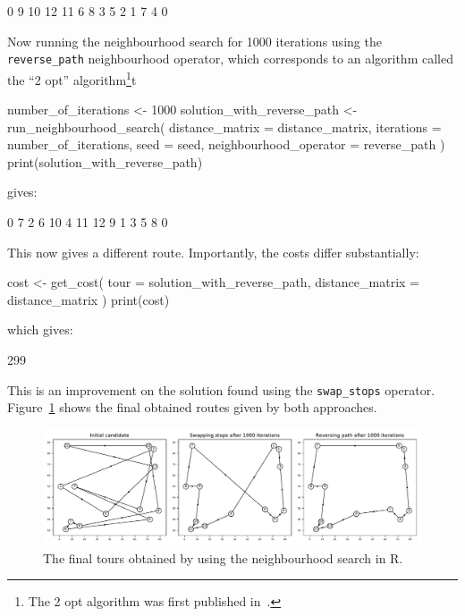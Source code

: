 \begin{Rout}
 [1]  0  9 10 12 11  6  8  3  5  2  1  7  4  0
\end{Rout}

Now running the neighbourhood search for 1000 iterations using the
\texttt{reverse_path} neighbourhood operator, which corresponds to
an algorithm called the ``2 opt'' algorithm\footnote{The 2 opt algorithm was
first published in~\cite{croes1958method}.
}t

\begin{Rin}
number_of_iterations <- 1000
solution_with_reverse_path <- run_neighbourhood_search(
  distance_matrix = distance_matrix,
  iterations = number_of_iterations,
  seed = seed,
  neighbourhood_operator = reverse_path
)
print(solution_with_reverse_path)
\end{Rin}

gives:

\begin{Rout}
 [1]  0  7  2  6 10  4 11 12  9  1  3  5  8  0
\end{Rout}

This now gives a different route.
Importantly, the costs differ substantially:

\begin{Rin}
cost <- get_cost(
  tour = solution_with_reverse_path,
  distance_matrix = distance_matrix
)
print(cost)
\end{Rin}

which gives:

\begin{Rout}
[1] 299
\end{Rout}

This is an improvement on the solution found using the \texttt{swap_stops}
operator. Figure~\ref{fig:final-tsp-tours-r} shows the final obtained routes
given by both approaches.


\begin{figure}
    \begin{center}
        \includegraphics[width=\textwidth]{./assets/final-tsp-tours-with-R/main.pdf}
    \end{center}
    \caption{The final tours obtained by using the neighbourhood search in R.}
    \label{fig:final-tsp-tours-r}
\end{figure}


